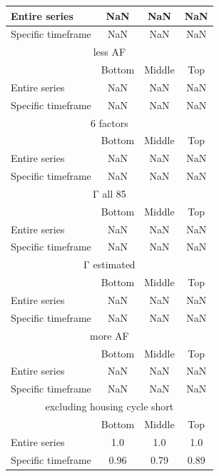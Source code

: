 \begin{table}[h!]
\begin{tabular}{|l|c|c|c|}
Entire series & NaN & NaN & NaN \\ \hline
Specific timeframe & NaN & NaN & NaN \\ \hline
\multicolumn{4}{|c|}{less AF} \\ \hline
& Bottom & Middle & Top \\ \hline
Entire series & NaN & NaN & NaN \\ \hline
Specific timeframe & NaN & NaN & NaN \\ \hline
\multicolumn{4}{|c|}{6 factors} \\ \hline
& Bottom & Middle & Top \\ \hline
Entire series & NaN & NaN & NaN \\ \hline
Specific timeframe & NaN & NaN & NaN \\ \hline
\multicolumn{4}{|c|}{Γ all 85} \\ \hline
& Bottom & Middle & Top \\ \hline
Entire series & NaN & NaN & NaN \\ \hline
Specific timeframe & NaN & NaN & NaN \\ \hline
\multicolumn{4}{|c|}{Γ estimated} \\ \hline
& Bottom & Middle & Top \\ \hline
Entire series & NaN & NaN & NaN \\ \hline
Specific timeframe & NaN & NaN & NaN \\ \hline
\multicolumn{4}{|c|}{more AF} \\ \hline
& Bottom & Middle & Top \\ \hline
Entire series & NaN & NaN & NaN \\ \hline
Specific timeframe & NaN & NaN & NaN \\ \hline
\multicolumn{4}{|c|}{excluding housing cycle short} \\ \hline
& Bottom & Middle & Top \\ \hline
Entire series & 1.0 & 1.0 & 1.0 \\ \hline
Specific timeframe & 0.96 & 0.79 & 0.89 \\ \hline
\end{tabular}
\end{table}
